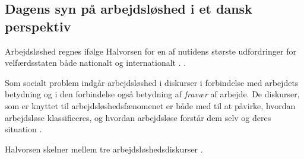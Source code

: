 \subsection{Dagens syn på arbejdsløshed i et dansk perspektiv} 

Arbejdsløshed regnes ifølge Halvorsen for en af nutidens største udfordringer for velfærdsstaten både nationalt og internationalt \textbf{\parencite[8]{Halvorsen1999}}. \textbf{\parencite[98]{Bauman1999}}. %

Som socialt problem indgår arbejdsløshed i diskurser i forbindelse med arbejdets betydning og i den forbindelse også betydning af \textit{fravær} af arbejde. De diskurser, som er knyttet til arbejdsløshedsfænomenet er både med til at påvirke, hvordan arbejdsløse klassificeres, og hvordan arbejdsløse forstår dem selv og deres situation \parencite[12]{Halvorsen1999}. %

Halvorsen skelner mellem tre arbejdsløshedsdiskurser \parencite[13]{Halvorsen1999}.

